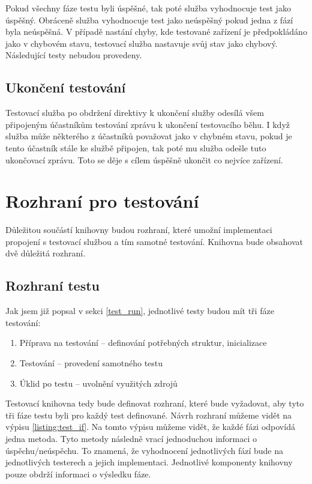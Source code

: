 Pokud všechny fáze testu byli úspěšné, tak poté služba vyhodnocuje test jako úspěšný. Obráceně služba vyhodnocuje test jako neúspěšný pokud jedna z fází byla neúspěšná. V případě nastání chyby, kde testované zařízení je předpokládáno jako v chybovém stavu, testovací služba nastavuje svůj stav jako chybový. Následující testy nebudou provedeny.


\subsection{Ukončení testování}
Testovací služba po obdržení direktivy k ukončení služby odesílá všem připojeným účastníkům testování zprávu k ukončení testovacího běhu. I když služba může některého z účastníků považovat jako v chybném stavu, pokud je tento účastník stále ke službě připojen, tak poté mu služba odešle tuto ukončovací zprávu. Toto se děje s cílem úspěšně ukončit co nejvíce zařízení.


\section{Rozhraní pro testování}
Důležitou součástí knihovny budou rozhraní, které umožní implementaci propojení s testovací službou a tím samotné testování. Knihovna bude obsahovat dvě důležitá rozhraní. 

\subsection{Rozhraní testu}
Jak jsem již popsal v sekci \ref{test_run}, jednotlivé testy budou mít tři fáze testování:

\begin{enumerate}
    \item Příprava na testování -- definování potřebných struktur, inicializace
    \item Testování -- provedení samotného testu
    \item Úklid po testu -- uvolnění využitých zdrojů
\end{enumerate}

Testovací knihovna tedy bude definovat rozhraní, které bude vyžadovat, aby tyto tři fáze testu byli pro každý test definované. Návrh rozhraní můžeme vidět na výpisu \ref{listing:test_if}. Na tomto výpisu můžeme vidět, že každé fázi odpovídá jedna metoda. Tyto metody následně vrací jednoduchou informaci o úspěchu/neúspěchu. To znamená, že vyhodnocení jednotlivých fází bude na jednotlivých testerech a jejich implementaci. Jednotlivé komponenty knihovny pouze obdrží informaci o výsledku fáze.

